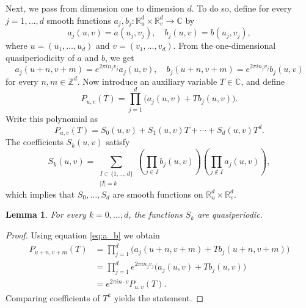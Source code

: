 \documentclass[reqno,a4paper,12pt]{amsart}
\numberwithin{equation}{section}
\newtheorem{lemma}[definition]{Lemma}
\def\C{{\mathbb C}}
\newcommand\1{\mathds{1}}
\begin{document}
Next, we pass from dimension one to dimension $d$. To do so, define for every $j=1,\dots,d$ smooth functions $a_j,b_j:
\mathbb R^d_u\times\mathbb R^d_v\to\mathbb C$ by
$$
a_j(u,v)
=
a(u_j,v_j), \quad b_j(u,v)
=
b(u_j,v_j),
$$
where $u=(u_1,\dots,u_d)$ and $v=(v_1,\dots,v_d)$.
From the one-dimensional quasiperiodicity of $a$ and $b$, we get
\begin{equation}\label{eq:a_b}
    a_j(u+n,v+m)
=
e^{2\pi i n_j v_j}a_j(u,v), \quad b_j(u+n,v+m)
=
e^{2\pi i n_j v_j}b_j(u,v)
\end{equation}
for every $n,m\in\mathbb Z^d$.
Now introduce an auxiliary variable $T \in \C$, and define
$$
P_{u,v}(T)
=
\prod_{j=1}^d
\bigl(a_j(u,v)+T b_j(u,v)\bigr).
$$
Write this polynomial as
$$
P_{u,v}(T)
=
S_0(u,v)+S_1(u,v)T+\cdots+S_d(u,v)T^d.
$$
The coefficients $S_k(u,v)$ satisfy
$$
S_k(u,v)
=
\sum_{\substack{I\subset\{1,\dots,d\}\\ |I|=k}}
\left(
\prod_{j\in I} b_j(u,v)
\right)
\left(
\prod_{j\notin I} a_j(u,v)
\right),
$$
which implies that $S_0,\dots,S_d$
are smooth functions on
$
\mathbb R^d_u\times\mathbb R^d_v.
$

\begin{lemma}
For every $k=0,\dots,d$, the functions $S_k$ are quasiperiodic.
\end{lemma}

\begin{proof}
Using equation \eqref{eq:a_b} we obtain
$$
\begin{aligned}
P_{u+n,v+m}(T)
&=
\prod_{j=1}^d
\bigl(a_j(u+n,v+m)+T b_j(u+n,v+m)\bigr) \\
&=
\prod_{j=1}^d
e^{2\pi i n_j v_j}
\bigl(a_j(u,v)+T b_j(u,v)\bigr) \\
&=
e^{2\pi i n\cdot v}P_{u,v}(T).
\end{aligned}
$$
Comparing coefficients of $T^k$ yields the statement.
\end{proof}
\end{document}
